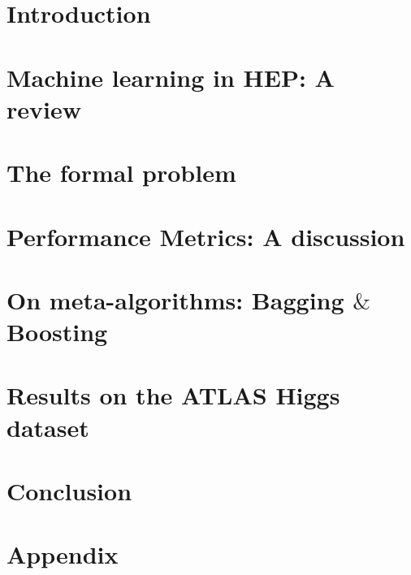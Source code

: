 \documentclass[a4paper,twoside]{report}
\begin{document}
\setcounter{secnumdepth}{3}
\setcounter{tocdepth}{3}






\tableofcontents 

\clearpage
\listoffigures
\clearpage
\printglossary[type=\acronymtype, title=Abbreviations,toctitle=Abbreviations,nonumberlist]
\printglossary[title=Symbols, toctitle=Symbols,nonumberlist]

\clearpage
\glsunsetall
{}

\chapter{Introduction}
\label{intro}


\chapter{Machine learning in HEP: A review}
\label{mlhep}


\chapter{The formal problem}
\label{formal}


\chapter{Performance Metrics: A discussion}
\label{performance}


\chapter{On meta-algorithms: Bagging \texorpdfstring{$\&$}{} Boosting}
\label{ad}


\chapter{Results on the ATLAS Higgs dataset}
\label{results}


%

\chapter{Conclusion}
\label{concl}






\chapter*{Appendix}

\end{document}

